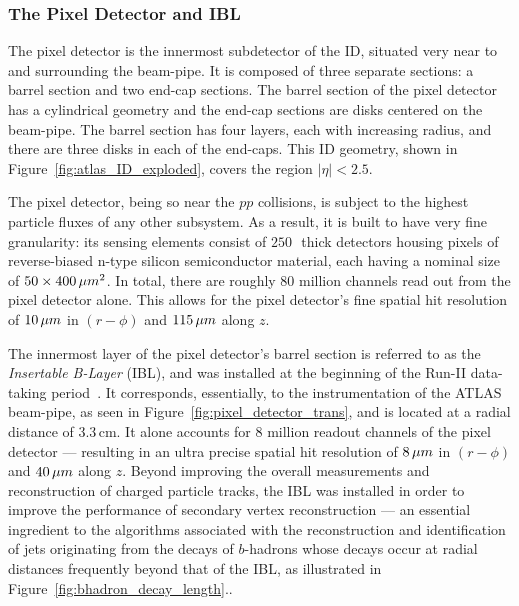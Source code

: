 \subsubsection{The Pixel Detector and IBL}
\label{sec:id_pixel}

The pixel detector is the innermost subdetector of the ID, situated very near to and surrounding
the beam-pipe.
It is composed of three separate sections: a barrel section and two end-cap sections.
The barrel section  of the pixel detector has a cylindrical geometry and the end-cap sections
are disks centered on the beam-pipe.
The barrel section has four layers, each with increasing radius, and there are three disks in each
of the end-caps. This ID geometry, shown in Figure~\ref{fig:atlas_ID_exploded}, covers
the region $\lvert \eta \rvert < 2.5$.

The pixel detector, being so near the $pp$ collisions, is subject to the highest particle
fluxes of any other subsystem.
As a result, it is built to have very fine granularity: its sensing elements consist of
$250$\,\micron~thick detectors housing pixels of reverse-biased n-type silicon semiconductor material,
each having a nominal size of $50\times400\,\mu m^2$.
In total, there are roughly 80 million channels read out from the pixel detector alone.
This allows for the pixel detector's fine spatial hit resolution of $10\,\mu m$ in
$(r-\phi)$ and $115\,\mu m$ along $z$.

The innermost layer of the pixel detector's barrel section is referred to as the
\textit{Insertable B-Layer} (IBL), and was installed at the beginning of the Run-II
data-taking period~\cite{Capeans:1291633}.
It corresponds, essentially, to the instrumentation of the ATLAS beam-pipe, as seen in Figure~\ref{fig:pixel_detector_trans},
and is located at a radial distance of 3.3\,cm.
It alone accounts for 8 million readout channels of
the pixel detector --- resulting in an ultra precise spatial hit resolution of $8\,\mu m$ in $(r-\phi)$ and
$40\,\mu m$ along $z$.
Beyond improving the overall measurements and reconstruction of charged particle tracks,
the IBL was installed in order to improve the performance of secondary vertex
reconstruction --- an essential ingredient to the algorithms associated with
the reconstruction and identification of jets originating from the decays
of $b$-hadrons whose decays occur at radial distances frequently beyond that
of the IBL, as illustrated in Figure~\ref{fig:bhadron_decay_length}..

